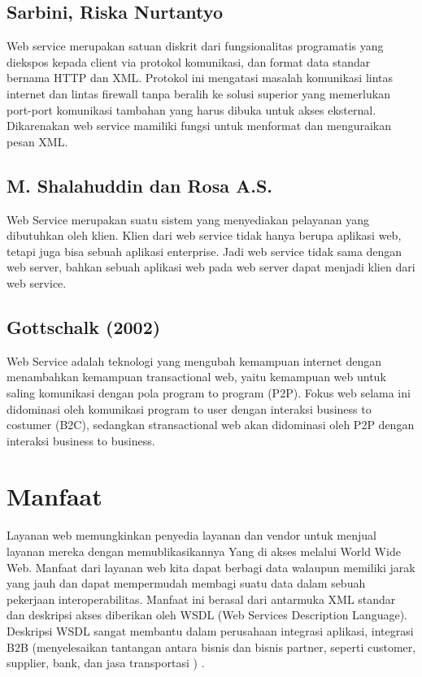 \documentclass[12pt]{journal}
\begin{document}
\subsection{Sarbini, Riska Nurtantyo}

Web service merupakan satuan diskrit dari fungsionalitas programatis yang diekspos 
kepada client via protokol komunikasi, dan format data standar bernama HTTP dan 
XML. Protokol ini mengatasi masalah komunikasi lintas internet dan lintas 
firewall tanpa beralih ke solusi superior yang memerlukan port-port komunikasi 
tambahan yang harus dibuka untuk akses eksternal. Dikarenakan web service mamiliki fungsi untuk menformat dan menguraikan pesan XML\cite{sarbini2015pengembangan}. 

\subsection{M. Shalahuddin dan Rosa A.S.}

Web Service merupakan suatu sistem yang menyediakan pelayanan yang dibutuhkan oleh klien. Klien dari web service tidak hanya berupa aplikasi web, tetapi juga bisa sebuah aplikasi enterprise. Jadi web service tidak sama dengan web server, bahkan sebuah aplikasi web pada web server dapat menjadi klien dari web service\cite{inayah2014aplikasi}.

\subsection{Gottschalk (2002)}

Web Service adalah teknologi yang mengubah kemampuan internet dengan menambahkan kemampuan transactional web, yaitu kemampuan web untuk saling komunikasi dengan pola program to program (P2P). Fokus web selama ini didominasi oleh komunikasi program to user dengan interaksi business to costumer (B2C), sedangkan stransactional web akan didominasi oleh P2P dengan interaksi business to business\cite{fauziah2014aplikasi}.


\section{Manfaat}

Layanan web memungkinkan penyedia layanan dan vendor untuk menjual layanan mereka dengan memublikasikannya
Yang di akses melalui World Wide Web.
Manfaat dari layanan web kita dapat berbagi data walaupun memiliki jarak yang jauh dan dapat mempermudah membagi suatu data dalam sebuah pekerjaan
interoperabilitas. Manfaat ini berasal dari antarmuka XML standar dan deskripsi akses
diberikan oleh WSDL (Web Services Description Language). Deskripsi WSDL sangat membantu dalam perusahaan
integrasi aplikasi, integrasi B2B (menyelesaikan tantangan antara bisnis dan bisnis partner, seperti customer, supplier, bank, dan jasa transportasi ) \cite{ferris2003web}.
\end{document}
